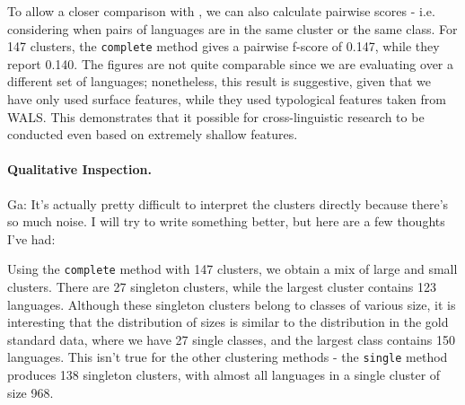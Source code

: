 To allow a closer comparison with , we can also calculate pairwise scores - i.e. considering when pairs of languages are in the same cluster or the same class. For 147 clusters, the \texttt{complete} method gives a pairwise f-score of 0.147, while they report 0.140. The figures are not quite comparable since we are evaluating over a different set of languages; nonetheless, this result is suggestive, given that we have only used surface features, while they used typological features taken from WALS.  This demonstrates that it possible for cross-linguistic research to be conducted even based on extremely shallow features.





\paragraph{Qualitative Inspection.}
Ga: It's actually pretty difficult to interpret the clusters directly because there's so much noise. I will try to write something better, but here are a few thoughts I've had:

Using the \texttt{complete} method with 147 clusters, we obtain a mix of large and small clusters. There are 27 singleton clusters, while the largest cluster contains 123 languages. Although these singleton clusters belong to classes of various size, it is interesting that the distribution of sizes is similar to the distribution in the gold standard data, where we have 27 single classes, and the largest class contains 150 languages.  This isn't true for the other clustering methods - the \texttt{single} method produces 138 singleton clusters, with almost all languages in a single cluster of size 968.